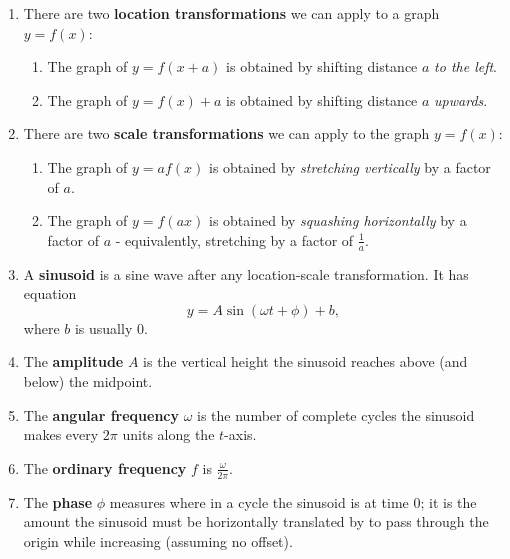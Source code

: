 \documentclass{article}
\begin{document}
\vspace{5mm}

\begin{enumerate}
\item There are two \textbf{location transformations} we can apply to a graph $y=f(x)$:
	\begin{enumerate}
	\item The graph of $y=f(x+a)$ is obtained by shifting distance $a$ \textit{to the left}.
	\item The graph of $y=f(x)+a$ is obtained by shifting distance $a$ \textit{upwards}.
	\end{enumerate}
\item There are two \textbf{scale transformations} we can apply to the graph $y=f(x)$:
	\begin{enumerate}
	\item The graph of $y=af(x)$ is obtained by \textit{stretching vertically} by a factor of $a$.
	\item The graph of $y=f(ax)$ is obtained by \textit{squashing horizontally} by a factor of $a$ - equivalently, stretching by a factor of $\frac{1}{a}$.
	\end{enumerate}
\item A \textbf{sinusoid} is a sine wave after any location-scale transformation. It has equation
\[y=A\sin(\omega t+\phi)+b,\]
where $b$ is usually 0.
\item The \textbf{amplitude} $A$ is the vertical height the sinusoid reaches above (and below) the midpoint.
\item The \textbf{angular frequency} $\omega$ is the number of complete cycles the sinusoid makes every $2\pi$ units along the $t$-axis.
\item The \textbf{ordinary frequency} $f$ is $\frac{\omega}{2\pi}$.
\item The \textbf{phase} $\phi$ measures where in a cycle the sinusoid is at time 0; it is the amount the sinusoid must be horizontally translated by to pass through the origin while increasing (assuming no offset).
\end{enumerate}
\end{document}
